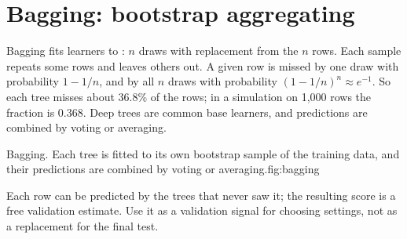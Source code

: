 \section{Bagging: bootstrap aggregating}

Bagging fits learners to : $n$ draws with replacement from the $n$ rows. Each sample repeats some rows and leaves others out. A given row is missed by one draw with probability $1-1/n$, and by all $n$ draws with probability $(1-1/n)^n\approx e^{-1}$. So each tree misses about 36.8\% of the rows; in a simulation on 1,000 rows the fraction is 0.368. Deep trees are common base learners, and predictions are combined by voting or averaging.

\begin{utpfig}[Bagging]{Bagging. Each tree is fitted to its own bootstrap sample of the training data, and their predictions are combined by voting or averaging.}{fig:bagging}
\end{utpfig}

Each row can be predicted by the trees that never saw it; the resulting  score is a free validation estimate. Use it as a validation signal for choosing settings, not as a replacement for the final test.


